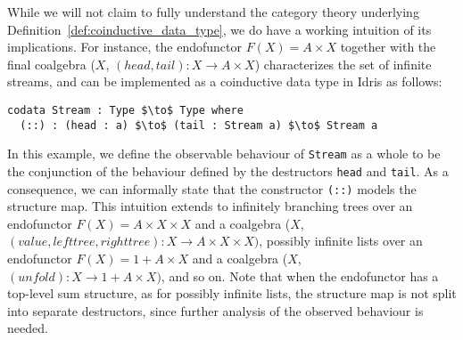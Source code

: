 While we will not claim to fully understand the category theory underlying
Definition~\ref{def:coinductive_data_type}, we do have a working intuition of
its implications. For instance, the endofunctor ${F(X)=A\times X}$ together with
the final coalgebra ($X$, $(head, tail) : X\to A\times X$) characterizes the set
of infinite streams, and can be implemented as a coinductive data type in Idris
as follows:
\begin{lstlisting}[mathescape]
codata Stream : Type $\to$ Type where
  (::) : (head : a) $\to$ (tail : Stream a) $\to$ Stream a
\end{lstlisting}
In this example, we define the observable behaviour of \texttt{Stream} as a
whole to be the conjunction of the behaviour defined by the destructors \texttt{head} and \texttt{tail}. As a consequence, we can informally state
that the constructor \texttt{(::)} models the structure map. This intuition extends to infinitely branching trees over an endofunctor
${F(X)=A\times X\times X}$ and a coalgebra ($X$, ${(value,lefttree,righttree) : X\to
A\times X\times X)}$, possibly infinite lists over an endofunctor ${F(X)=1 + A\times X}$ and a coalgebra ($X$, ${(unfold) : X\to
1 + A\times X)}$, and so on. Note that when the endofunctor has a top-level sum structure,
as for possibly infinite lists, the structure map is not split into separate
destructors, since further analysis of the observed behaviour is needed.


